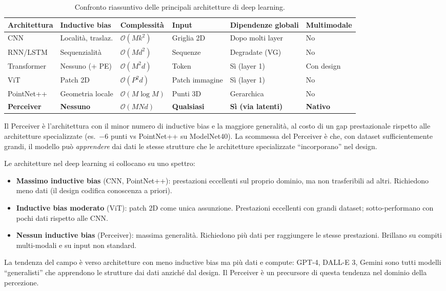 \documentclass[12pt,a4paper]{article}
\begin{document}
\begin{table}[htbp]
\centering
\caption{Confronto riassuntivo delle principali architetture di deep learning.}
\begin{tabular}{@{}p{2.2cm}p{2.5cm}p{2cm}p{1.5cm}p{2.5cm}p{2cm}@{}}
\toprule
\textbf{Architettura} & \textbf{Inductive bias} & \textbf{Complessit\`a} & \textbf{Input} & \textbf{Dipendenze globali} & \textbf{Multimodale} \\
\midrule
CNN & Localit\`a, traslaz. & $\mathcal{O}(Mk^2)$ & Griglia 2D & Dopo molti layer & No \\
RNN/LSTM & Sequenzialit\`a & $\mathcal{O}(Md^2)$ & Sequenze & Degradate (VG) & No \\
Transformer & Nessuno (+ PE) & $\mathcal{O}(M^2d)$ & Token & S\`i (layer 1) & Con design \\
ViT & Patch 2D & $\mathcal{O}(P^2d)$ & Patch immagine & S\`i (layer 1) & No \\
PointNet++ & Geometria locale & $\mathcal{O}(M\log M)$ & Punti 3D & Gerarchica & No \\
\textbf{Perceiver} & \textbf{Nessuno} & $\mathcal{O}(MNd)$ & \textbf{Qualsiasi} & \textbf{S\`i (via latenti)} & \textbf{Nativo} \\
\bottomrule
\end{tabular}
\end{table}

Il Perceiver \`e l'architettura con il minor numero di inductive bias e la maggiore generalit\`a, al costo di un gap prestazionale rispetto alle architetture specializzate (es.\ $-6$ punti vs PointNet++ su ModelNet40). La scommessa del Perceiver \`e che, con dataset sufficientemente grandi, il modello pu\`o \emph{apprendere} dai dati le stesse strutture che le architetture specializzate ``incorporano'' nel design.

\begin{notabox}
Le architetture nel deep learning si collocano su uno spettro:
\begin{itemize}
    \item \textbf{Massimo inductive bias} (CNN, PointNet++): prestazioni eccellenti sul proprio dominio, ma non trasferibili ad altri. Richiedono meno dati (il design codifica conoscenza a priori).
    \item \textbf{Inductive bias moderato} (ViT): patch 2D come unica assunzione. Prestazioni eccellenti con grandi dataset; sotto-performano con pochi dati rispetto alle CNN.
    \item \textbf{Nessun inductive bias} (Perceiver): massima generalit\`a. Richiedono pi\`u dati per raggiungere le stesse prestazioni. Brillano su compiti multi-modali e su input non standard.
\end{itemize}

La tendenza del campo \`e verso architetture con meno inductive bias ma pi\`u dati e compute: GPT-4, DALL-E 3, Gemini sono tutti modelli ``generalisti'' che apprendono le strutture dai dati anzich\'e dal design. Il Perceiver \`e un precursore di questa tendenza nel dominio della percezione.
\end{notabox}
\end{document}
